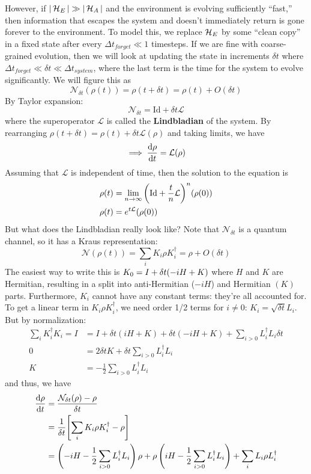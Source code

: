 However, if $|\operatorname{\mathcal{H}}_E| \gg |\operatorname{\mathcal{H}}_A|$ and the environment is evolving sufficiently ``fast,'' then information
that escapes the system and doesn't immediately return is gone forever to the environment. To model this,
we replace $\operatorname{\mathcal{H}}_E$ by some ``clean copy'' in a fixed state after every $\Delta t_{forget} \ll 1$ timesteps. If we are fine with coarse-grained evolution,
then we will look at updating the state in increments $\delta t$
where $\Delta t_{forget} \ll \delta t \ll \Delta t_{system}$, where the last term is the time for the
system to evolve significantly. We will figure this as
\[ \mathcal{N}_{\delta t}(\rho(t)) = \rho(t + \delta t) = \rho(t) + O(\delta t) \]
By Taylor expansion:
\[ \mathcal{N}_{\delta t} = \textrm{Id} + \delta t \mathcal{L} \]
where the superoperator $\mathcal{L}$ is called the \textbf{Lindbladian} of the system. By
rearranging $\rho(t + \delta t) = \rho(t) + \delta t \mathcal{L}(\rho)$ and taking limits, we have 
\[ \implies \dv{\rho}{t} = \mathcal{L}(\rho) \]
Assuming that $\mathcal{L}$ is independent of time, then the solution to the equation is
\begin{align*}
    \rho(t) &= \lim_{n \to \infty} \qty(\textrm{Id} + \frac{t}{n} \mathcal{L})^n \qty(\rho(0)) \\
    \rho(t) &= e^{t \mathcal{L}}(\rho(0))
\end{align*}
But what does the Lindbladian really look like? Note that $\mathcal{N}_{\delta t}$ is a quantum channel,
so it has a Kraus representation:
\[ \mathcal{N}(\rho(t)) = \sum_{i} K_i \rho K_i^{\dagger} = \rho + O(\delta t) \]
The easiest way to write this is $K_0 = I + \delta t \qty(-iH + K)$ where $H$ and $K$ are Hermitian, resulting in a split into anti-Hermitian ($-iH$) and Hermitian $(K)$ parts. Furthermore, $K_i$ cannot have any constant terms: they're all accounted for.
To get a linear term in $K_i \rho K_i^{\dagger}$, we need order 1/2 terms for $i \neq 0$:
$K_i = \sqrt{\delta t} L_i$. But by normalization:
\begin{align*}
    \sum_i K_i^{\dagger} K_i = I &= I + \delta t(iH + K) + \delta t(-iH + K) + \sum_{i > 0} L_i^{\dagger} L_i \delta t \\
    0 &= 2 \delta t K + \delta t \sum_{i > 0} L_i^{\dagger} L_i \\
    K &= -\frac{1}{2} \sum_{i > 0} L_i^{\dagger} L_i
\end{align*}
and thus, we have
\begin{align*}
    \dv{\rho}{t} &= \frac{\mathcal{N}_{\delta t} (\rho) - \rho}{\delta t} \\
     &= \frac{1}{\delta t} \qty[\sum_i K_i \rho K_i^{\dagger} - \rho] \\
     &= \left(-iH - \frac{1}{2} \sum_{i > 0} L_i^{\dagger} L_i\right)\rho + \rho \left(iH - \frac{1}{2}\sum_{i > 0} L_i^{\dagger} L_i\right) + \sum_i L_i \rho L_i^{\dagger}
\end{align*}
